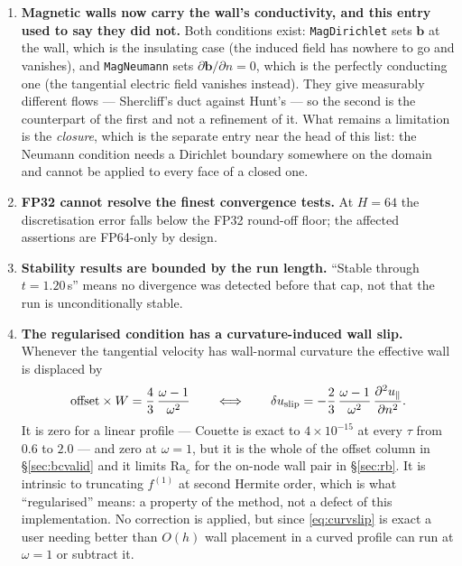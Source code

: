 \documentclass[11pt,a4paper]{article}
\newcommand{\code}[1]{\texttt{\small #1}}
\newcommand{\bb}{\bm{b}}
\newcommand{\e}[1]{\times 10^{#1}}
\begin{document}
\begin{enumerate}[leftmargin=1.4em,itemsep=4pt]
\item \textbf{Magnetic walls now carry the wall's conductivity, and this entry
  used to say they did not.} Both conditions exist: \code{MagDirichlet} sets
  $\bb$ at the wall, which is the insulating case (the induced field has nowhere
  to go and vanishes), and \code{MagNeumann} sets $\partial\bb/\partial n=0$,
  which is the perfectly conducting one (the tangential electric field vanishes
  instead). They give measurably different flows --- Shercliff's duct against
  Hunt's --- so the second is the counterpart of the first and not a refinement
  of it. What remains a limitation is the \emph{closure}, which is the separate
  entry near the head of this list: the Neumann condition needs a Dirichlet
  boundary somewhere on the domain and cannot be applied to every face of a
  closed one.

\item \textbf{FP32 cannot resolve the finest convergence tests.} At $H=64$ the
  discretisation error falls below the FP32 round-off floor; the affected
  assertions are FP64-only by design.

\item \textbf{Stability results are bounded by the run length.} ``Stable through
  $t=1.20$\,s'' means no divergence was detected before that cap, not that the run
  is unconditionally stable.

\item \textbf{The regularised condition has a curvature-induced wall slip.}
  Whenever the tangential velocity has wall-normal curvature the effective wall
  is displaced by
  \begin{equation}
    \text{offset}\times W = \frac{4}{3}\,\frac{\omega-1}{\omega^{2}}
    \qquad\Longleftrightarrow\qquad
    \delta u_{\rm slip} = -\frac23\,\frac{\omega-1}{\omega^2}
                          \,\frac{\partial^2u_\parallel}{\partial n^2}.
    \label{eq:curvslip2}
  \end{equation}
  It is zero for a linear profile --- Couette is exact to $4\e{-15}$ at every
  $\tau$ from $0.6$ to $2.0$ --- and zero at $\omega=1$, but it is the whole of
  the offset column in \S\ref{sec:bcvalid} and it limits $\mathrm{Ra}_c$ for the
  on-node wall pair in \S\ref{sec:rb}. It is intrinsic to truncating $f^{(1)}$ at
  second Hermite order, which is what ``regularised'' means: a property of the
  method, not a defect of this implementation. No correction is applied, but
  since \eqref{eq:curvslip} is exact a user needing better than $O(h)$ wall
  placement in a curved profile can run at $\omega=1$ or subtract it.


\end{enumerate}
\end{document}
